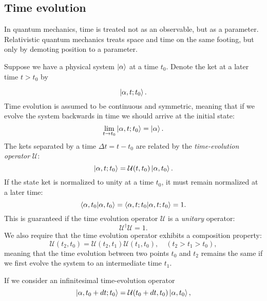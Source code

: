 \subsection{Time evolution}
In quantum mechanics, time is treated not as an observable,
but as a parameter. Relativistic quantum mechanics
treats space and time on the same footing, but only by demoting
position to a parameter.
\par
Suppose we have a physical system $\ket{\alpha}$
at a time $t_0$. Denote the ket at a later time $t > t_0$ by

\begin{equation}
 \ket{\alpha, t; t_0} .
\end{equation}
Time evolution is assumed to be continuous and symmetric,
meaning that if we evolve the system backwards in time
we should arrive at the initial state:
\begin{equation}
 \lim_{t \rightarrow t_0} \ket{\alpha, t; t_0}
= \ket{\alpha} .
\end{equation}
The kets separated by a time $\Delta t = t - t_0$
are related by the \textit{time-evolution operator} $\mathcal{U}$:
\begin{equation}
 \ket{\alpha, t; t_0} = \mathcal{U}(t, t_0) \ket{\alpha, t_0} .
\end{equation}
If the state ket is normalized to unity at a time $t_0$,
it must remain normalized at a later time:
\begin{equation}
 \braket{\alpha, t_0 | \alpha, t_0} = \braket{\alpha, t; t_0
    | \alpha, t; t_0} = 1 .
\end{equation}
This is guaranteed if the time evolution operator
$\mathcal{U}$ is a \textit{unitary} operator:
\begin{equation}
 \mathcal{U}^{\dagger} \mathcal{U} = 1 .
\end{equation}
We also require that the time evolution operator
exhibits a composition property:
\begin{equation}
 \mathcal{U}(t_2, t_0) = \mathcal{U}(t_2, t_1)
    \mathcal{U}(t_1, t_0), \quad (t_2 > t_1 > t_0) ,
\end{equation}
meaning that the time evolution between two points
$t_0$ and $t_2$ remains the same if we first evolve the system
to an intermediate time $t_1$.
\par
If we consider an infinitesimal time-evolution operator
\begin{equation}
 \ket{\alpha, t_0 + dt; t_0} = \mathcal{U}(t_0 + dt, t_0)
\ket{\alpha, t_0} ,
\end{equation}
